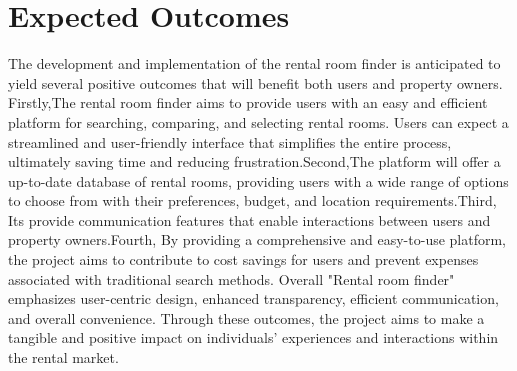 \section*{Expected Outcomes}
The development and implementation of the rental room finder is anticipated to yield several positive outcomes that will benefit both users and property owners. Firstly,The rental room finder aims to provide users with an easy and efficient platform for searching, comparing, and selecting rental rooms. Users can expect a streamlined and user-friendly interface that simplifies the entire process, ultimately saving time and reducing frustration.Second,The platform will offer a  up-to-date database of rental rooms, providing users with a wide range of options to choose from with their preferences, budget, and location requirements.Third, Its provide communication features that enable interactions between users and property owners.Fourth, By providing a comprehensive and easy-to-use platform, the project aims to contribute to cost savings for users and prevent expenses associated with traditional search methods.
Overall "Rental room finder" emphasizes user-centric design, enhanced transparency, efficient communication, and overall convenience. Through these outcomes, the project aims to make a tangible and positive impact on individuals' experiences and interactions within the rental  market.